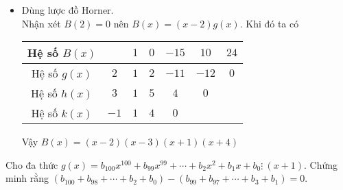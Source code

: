 \begin{vn}
{\begin{enumerate}[a)]
\begin{itemize}
				\begin{center}
				\end{center}
				ta được thương là $ h(x)=x^2+5x+4 $ dư $ 0 $. Mà $ h(-1)=0 $ lấy $ h(x) $ chia cho $ x+1 $ 
				\begin{center}
				\end{center}
				ta được thương là $ x+4 $ dư $ 0 $.\\
				Vậy $ B(x)=(x-2)(x-3)(x+1)(x+4)$. 
				\item Dùng lược đồ Horner.\\
				Nhận xét $ B(2)=0 $ nên $ B(x)=(x-2)g(x)$. Khi đó ta có
				\begin{center}
					\begin{tabular}{|c|c|c|c|c|c|c|}
						\hline 
						Hệ số $B(x)$&  & $1$ & $0$ & $-15$ & $10$ & $24$\\ 
						\hline 
						Hệ số $g(x)$& $2$ & $1$ & $2$ & $-11$ & $-12$ & $0$\\ 
						\hline 
						Hệ số $h(x)$& $3$ & $ 1 $ & $ 5 $ & $ 4 $ & $ 0 $ &  \\ 
						\hline 
						Hệ số $k(x)$& $-1$& $ 1 $ & $ 4 $ & $ 0 $ &  &  \\ 
						\hline 
					\end{tabular} 	
				\end{center}
				
				Vậy $ B(x)=(x-2)(x-3)(x+1)(x+4)$
			\end{itemize}
			
		\end{enumerate}
	}
\end{vn}
\begin{vn}
Cho đa thức $ g(x)=b_{100}x^{100}+b_{99}x^{99}+\dotsb+b_2x^2+b_1x+b_0 \vdots \ (x+1)$. Chứng minh rằng $\left(b_{100}+b_{98}+\dotsb+b_2+b_0 \right)-\left(b_{99}+b_{97}+\dotsb+b_3+b_1 \right)=0 $.
\end{vn}
